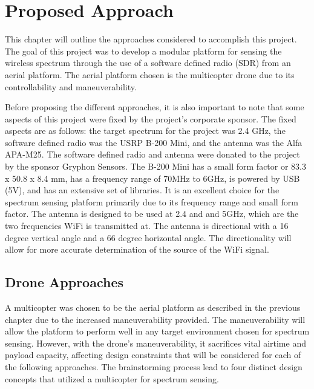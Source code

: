 \chapter{Proposed Approach}
This chapter will outline the approaches considered to accomplish this project. The goal of this project was to develop a modular platform for sensing the wireless spectrum through the use of a software defined radio (SDR) from an aerial platform. The aerial platform chosen is the multicopter drone due to its controllability and maneuverability. \par

Before proposing the different approaches, it is also important to note that some aspects of this project were fixed by the project’s corporate sponsor. The fixed aspects are as follows: the target spectrum for the project was 2.4 GHz, the software defined radio was the USRP B-200 Mini, and the antenna was the Alfa APA-M25. The software defined radio and antenna were donated to the project by the sponsor Gryphon Sensors. The B-200 Mini has a small form factor or 83.3 x 50.8 x 8.4 mm, has a frequency range of 70MHz to 6GHz, is powered by USB (5V), and has an extensive set of libraries. It is an excellent choice for the spectrum sensing platform primarily due to its frequency range and small form factor. The antenna is designed to be used at 2.4 and and 5GHz, which are the two frequencies WiFi is transmitted at. The antenna is directional with a 16 degree vertical angle and a 66 degree horizontal angle. The directionality will allow for more accurate determination of the source of the WiFi signal.

\section{Drone Approaches}
A multicopter was chosen to be the aerial platform as described in the previous chapter due to the increased maneuverability provided. The maneuverability will allow the platform to perform well in any target environment chosen for spectrum sensing. However, with the drone’s maneuverability, it sacrifices vital airtime and payload capacity, affecting design constraints that will be considered for each of the following approaches. The brainstorming process lead to four distinct design concepts that utilized a multicopter for spectrum sensing. \par


